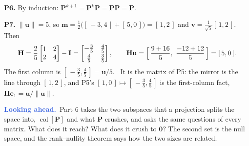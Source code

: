 \documentclass[11pt]{article}
\theoremstyle{plain}
\theoremstyle{definition}
\theoremstyle{remark}
\newcommand{\lookahead}{\par\smallskip\noindent
  \textbf{\sffamily\textcolor{RoyalBlue}{Looking ahead.}}\ \ignorespaces}
\newcommand{\vc}[1]{\mathbf{#1}}
\newcommand{\mt}[1]{\mathbf{#1}}
\newcommand{\norm}[1]{\lVert #1\rVert}
\newcommand{\colsp}[1]{\operatorname{col}[#1]}
\begin{document}
\smallskip
\noindent\textbf{P6.} By induction: $\mt{P}^{k+1}=\mt{P}^{k}\mt{P}=\mt{P}\mt{P}=\mt{P}$.

\smallskip
\noindent\textbf{P7.} $\norm{\vc{u}}=5$, so
$\vc{m}=\frac12\bigl([\,-3,4\,]+[\,5,0\,]\bigr)=[\,1,2\,]$ and
$\vc{v}=\frac{1}{\sqrt5}[\,1,2\,]$. Then
\[
  \mt{H}=\frac25\begin{bmatrix}1&2\\2&4\end{bmatrix}-\mt{I}
  =\begin{bmatrix}-\frac35&\frac45\\[2pt]\frac45&\frac35\end{bmatrix},
  \qquad
  \mt{H}\vc{u}=\Bigl[\,\frac{9+16}{5},\ \frac{-12+12}{5}\,\Bigr]=[\,5,0\,].
\]
The first
column is $[\,-\frac35,\frac45\,]=\vc{u}/5$. \checkmark\ It is the matrix of P5:
the mirror is the line through $[\,1,2\,]$, and P5's
$[\,1,0\,]\mapsto[\,-\frac35,\frac45\,]$ is the first-column fact,
$\mt{H}\vc{e}_1=\vc{u}/\norm{\vc{u}}$.

\lookahead Part 6 takes the two subspaces that a projection splits the space
into, $\colsp{\mt{P}}$ and what $\mt{P}$ crushes, and asks the same questions of
every matrix. What does it reach? What does it crush to $\vc{0}$? The second set
is the null space, and the rank--nullity theorem says how the two sizes are
related.
\end{document}

